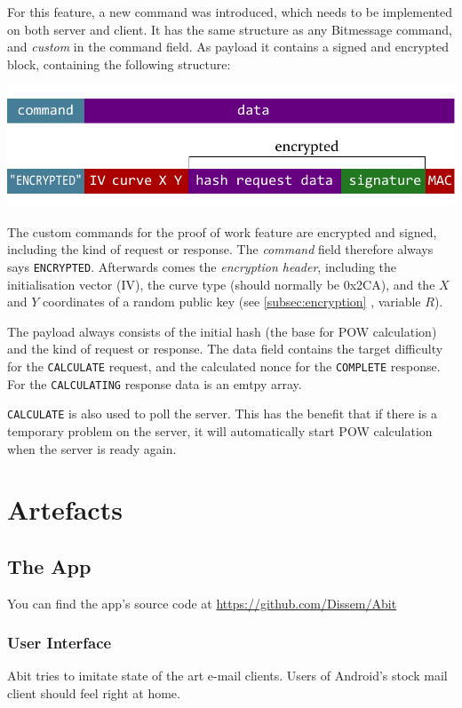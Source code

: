 \documentclass{bfh}
\begin{document}
  For this feature, a new command was introduced, which needs to be implemented on both server and client. It has the same structure as any Bitmessage command, and \textit{custom} in the command field. As payload it contains a signed and encrypted block, containing the following structure:

  \includegraphics[width=\textwidth]{images/custom_message.pdf}

  The custom commands for the proof of work feature are encrypted and signed, including the kind of request or response. The \textit{command} field therefore always says \texttt{ENCRYPTED}. Afterwards comes the \textit{encryption header}, including the initialisation vector (IV), the curve type (should normally be 0x2CA), and the $X$ and $Y$ coordinates of a random public key (see \ref{subsec:encryption} , variable $R$).

  The payload always consists of the initial hash (the base for \ac{POW} calculation) and the kind of request or response. The data field contains the target difficulty for the \texttt{CALCULATE} request, and the calculated nonce for the \texttt{COMPLETE} response. For the \texttt{CALCULATING} response data is an emtpy array.

  \texttt{CALCULATE} is also used to poll the server. This has the benefit that if there is a temporary problem on the server, it will automatically start \ac{POW} calculation when the server is ready again.


  \newpage
  \section{Artefacts}

  \subsection{The App}
  You can find the app's source code at \url{https://github.com/Dissem/Abit}

  \subsubsection{User Interface}
  Abit tries to imitate state of the art e-mail clients. Users of Android's stock mail client should feel right at home.
\end{document}

